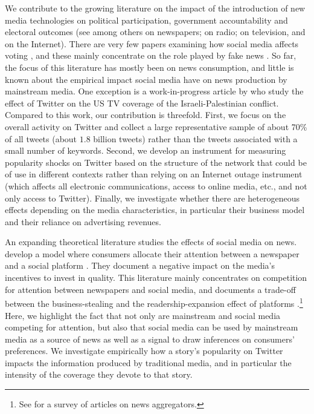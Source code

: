 We contribute to the growing literature on the impact of the introduction of new media technologies on political participation, government accountability and electoral outcomes (see among others \citet{Gentzkowetal2011,SnyderStromberg2010} on newspapers; \citet{Stromberg2004} on radio; \citet{Gentzkow2006,AngelucciCage2019,AngelucciCageSinkinson2020} on television, and \citet{BoxellGentzkowShapiro2018,Gavazzaetal2019} on the Internet). There are very few papers examining how social media affects voting \citep[for a review of the literature see][]{Zhuravskayaetal2020}, and these mainly concentrate on the role played by fake news \citep{AllcottGentzkow2017}. So far, the focus of this literature has mostly been on news consumption, and little is known about the empirical impact social media have on news production by mainstream media. One exception is a work-in-progress article by \citet{HatteMadinierZhuravskaya2020}  who study the effect of Twitter on the US  TV coverage of the Israeli-Palestinian conflict. Compared to this work, our contribution is threefold. First, we focus on the overall activity on Twitter and collect a large representative sample of about 70\% of all tweets (about $1.8$ billion tweets) rather than the tweets associated with a small number of keywords. Second, we develop an instrument for measuring popularity shocks on Twitter based on the structure of the network that could be of use in different contexts rather than relying on an Internet outage instrument (which affects all electronic communications, access to online media, etc., and not only access to Twitter). Finally, we investigate whether there are heterogeneous effects depending on the media characteristics, in particular their business model and their reliance on advertising revenues.

An expanding theoretical literature studies the effects of social media on news.  develop a model where consumers allocate their attention between a newspaper and a social platform \citep[see also][for a theory of news coverage in environments of information abundance]{AlaouiGermano2020}. They document a negative impact on the media's incentives to invest in quality. This literature mainly concentrates on competition for attention between newspapers and social media, and documents a trade-off between the business-stealing and the readership-expansion effect of platforms \citep{JeonNasr2016}.\footnote{See \citet{Jeon2018} for a survey of articles on news aggregators.}  Here, we highlight the fact that not only are mainstream and social media competing for attention, but also that social media can be used by mainstream media as a source of news as well as a signal to draw inferences on consumers' preferences. We investigate empirically how a story's popularity on Twitter impacts the information produced by traditional media, and in particular the intensity of the coverage they devote to that story.

